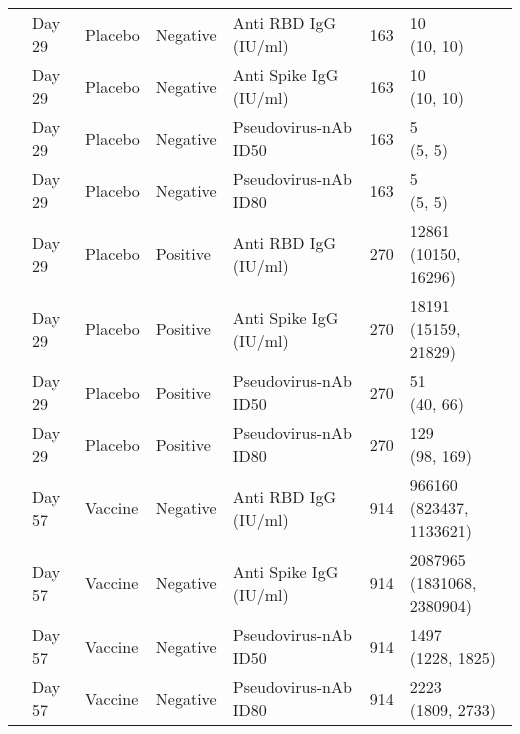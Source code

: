 \documentclass[]{book}
\theoremstyle{definition}
\theoremstyle{definition}
\theoremstyle{definition}
\newcommand{\1}{\mathbbm{1}}
\begin{document}
\begin{landscape}
\begin{ThreePartTable}
\begin{longtable}[t]{>{\raggedright\arraybackslash}p{7cm}llllll}
\hspace{1em} & Day 29 & Placebo & Negative & Anti RBD IgG (IU/ml) & 163 & \makecell[l]{10\\(10, 10)}\\
\hspace{1em} & Day 29 & Placebo & Negative & Anti Spike IgG (IU/ml) & 163 & \makecell[l]{10\\(10, 10)}\\
\hspace{1em} & Day 29 & Placebo & Negative & Pseudovirus-nAb ID50 & 163 & \makecell[l]{5\\(5, 5)}\\
\hspace{1em} & Day 29 & Placebo & Negative & Pseudovirus-nAb ID80 & 163 & \makecell[l]{5\\(5, 5)}\\
\hspace{1em} & Day 29 & Placebo & Positive & Anti RBD IgG (IU/ml) & 270 & \makecell[l]{12861\\(10150, 16296)}\\
\hspace{1em} & Day 29 & Placebo & Positive & Anti Spike IgG (IU/ml) & 270 & \makecell[l]{18191\\(15159, 21829)}\\
\hspace{1em} & Day 29 & Placebo & Positive & Pseudovirus-nAb ID50 & 270 & \makecell[l]{51\\(40, 66)}\\
\hspace{1em} & Day 29 & Placebo & Positive & Pseudovirus-nAb ID80 & 270 & \makecell[l]{129\\(98, 169)}\\
\hspace{1em} & Day 57 & Vaccine & Negative & Anti RBD IgG (IU/ml) & 914 & \makecell[l]{966160\\(823437, 1133621)}\\
\hspace{1em} & Day 57 & Vaccine & Negative & Anti Spike IgG (IU/ml) & 914 & \makecell[l]{2087965\\(1831068, 2380904)}\\
\hspace{1em} & Day 57 & Vaccine & Negative & Pseudovirus-nAb ID50 & 914 & \makecell[l]{1497\\(1228, 1825)}\\
\hspace{1em} & Day 57 & Vaccine & Negative & Pseudovirus-nAb ID80 & 914 & \makecell[l]{2223\\(1809, 2733)}\\

\end{longtable}
\end{ThreePartTable}
\end{landscape}
\end{document}
